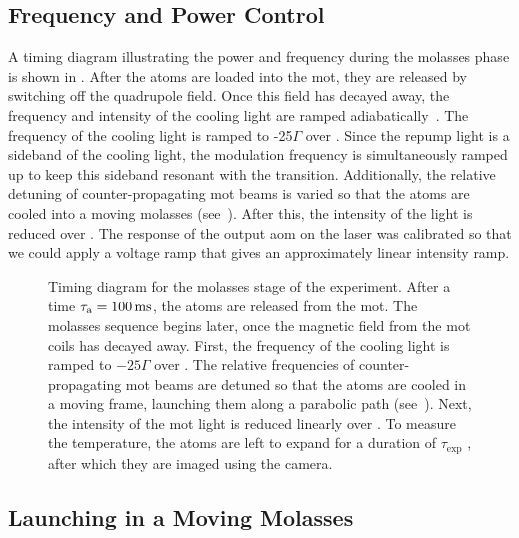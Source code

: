 \subsection{Frequency and Power Control}\label{subsec:molasses_control}
A timing diagram illustrating the power and frequency during the
molasses phase is shown in .
After the atoms are loaded into the \ac{mot}, they are released by
switching off the quadrupole field. Once this field has decayed away,
the frequency and intensity of the cooling light are ramped
adiabatically~\cite{Molmer1990}. The frequency of the cooling light is ramped to
-25\(\Gamma\) over . Since the repump
light is a sideband of the cooling light, the modulation frequency is
simultaneously ramped up to keep this sideband resonant with the
 transition. Additionally, the relative detuning of
counter-propagating \ac{mot} beams is varied so that the atoms are
cooled into a moving molasses
(see~). After this, the intensity
of the light is reduced over . The response
of the output \ac{aom} on the \Muquans laser was calibrated so that we
could apply a voltage ramp that gives an approximately linear
intensity ramp.
\begin{figure}[!htbp]
  \centering
  \fontsize{14pt}{14pt}
  \resizebox{0.7\textwidth}{!}{}
  \caption[Molasses stage timing diagram]{Timing diagram for the
    molasses stage of the experiment. After a time \(\tau_\text{a} =
    \sivalue{100}{\milli\second}\), the atoms are released from the
    \ac{mot}. The molasses sequence begins 
    later, once the magnetic field from the \ac{mot} coils has decayed
    away. First, the frequency of the cooling light is ramped to \(-25
    \Gamma\) over . The relative frequencies
    of counter-propagating \ac{mot} beams are detuned so that the atoms
    are cooled in a moving frame, launching them along a parabolic path
    (see~). Next, the intensity of the
    \ac{mot} light is reduced linearly over . To
    measure the temperature, the atoms are left to expand for a duration
    of \(\tau_\text{exp}\) \sivalue{}{\milli\second}, after which they are
  imaged using the camera.}
  \label{fig:molasses_timing}
\end{figure}
\subsection{Launching in a Moving Molasses}\label{subsec:moving_molasses}


